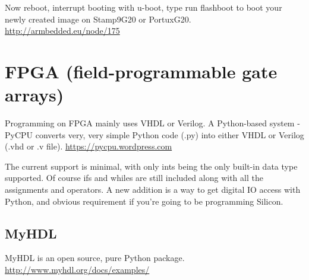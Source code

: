 Now reboot, interrupt booting with u-boot, type run flashboot to boot your
newly created image on Stamp9G20 or PortuxG20.
\url{http://armbedded.eu/node/175}

\section{FPGA (field-programmable gate arrays)}
\label{sec:FPGA}

Programming on FPGA mainly uses VHDL or Verilog. A Python-based system - PyCPU
converts very, very simple Python code (.py) into either VHDL or Verilog (.vhd
or .v file).
\url{https://pycpu.wordpress.com}

The current support is minimal, with only ints being the only built-in data type
supported. Of course ifs and whiles are still included along with all the
assignments and operators. A new addition is a way to get digital IO access with
Python, and obvious requirement if you’re going to be programming Silicon.


\subsection{MyHDL}

MyHDL is an open source, pure Python package. 
\url{http://www.myhdl.org/docs/examples/}